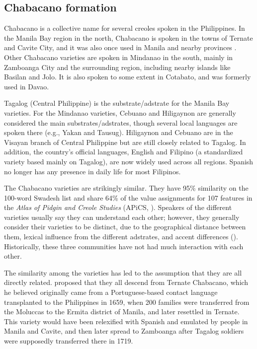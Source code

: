 \documentclass[output=paper,colorlinks,citecolor=brown]{langscibook}
\begin{document}
\subsection{Chabacano formation}

Chabacano is a collective name for several creoles spoken in the Philippines. In the Manila Bay region in the north, Chabacano is spoken in the towns of Ternate and Cavite City, and it was also once used in Manila and nearby provinces \citep{Fernández2011}. Other Chabacano varieties are spoken in Mindanao in the south, mainly in Zamboanga City and the surrounding region, including nearby islands like Basilan and Jolo. It is also spoken to some extent in Cotabato, and was formerly used in Davao. 

Tagalog (Central Philippine) is the substrate/adstrate for the Manila Bay varieties. For the Mindanao varieties, Cebuano and Hiligaynon are generally considered the main substrates/adstrates, though several local languages are spoken there (e.g., Yakan and Tausug). Hiligaynon and Cebuano are in the Visayan branch of Central Philippine but are still closely related to Tagalog. In addition, the country's official languages, English and Filipino (a standardized variety based mainly on Tagalog), are now widely used across all regions. Spanish no longer has any presence in daily life for most Filipinos.

The Chabacano varieties are strikingly similar. They have 95\% similarity on the 100-word Swadesh list \citep[27]{Sippola2011} and share 64\% of the value assignments for 107 features in the \textit{Atlas of Pidgin and Creole Studies} (APiCS, \citealt{MichaelisHuber2013}). Speakers of the different varieties usually say they can understand each other; however, they generally consider their varieties to be distinct, due to the geographical distance between them, lexical influence from the different adstrates, and accent differences (\citealt{LeshoSippola2014}). Historically, these three communities have not had much interaction with each other.

The similarity among the varieties has led to the assumption that they are all directly related. \citet{Whinnom1956} proposed that they all descend from Ternate Chabacano, which he believed originally came from a Portuguese-based contact language transplanted to the Philippines in 1659, when 200 families were transferred from the Moluccas to the Ermita district of Manila, and later resettled in Ternate. This variety would have been relexified with Spanish and emulated by people in Manila and Cavite, and then later spread to Zamboanga after Tagalog soldiers were supposedly transferred there in 1719. 
\end{document}
